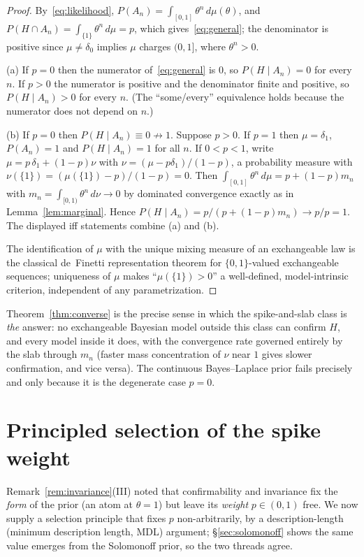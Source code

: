 \documentclass{amsart}
\theoremstyle{definition}
\begin{document}
\begin{proof}
By~\eqref{eq:likelihood}, $P(A_n)=\int_{[0,1]}\theta^n\,d\mu(\theta)$, and
$P(H\cap A_n)=\int_{\{1\}}\theta^n\,d\mu=p$, which gives~\eqref{eq:general}; the
denominator is positive since $\mu\ne\delta_0$ implies $\mu$ charges $(0,1]$,
where $\theta^n>0$.

(a) If $p=0$ then the numerator of~\eqref{eq:general} is $0$, so
$P(H\mid A_n)=0$ for every $n$. If $p>0$ the numerator is positive and the
denominator finite and positive, so $P(H\mid A_n)>0$ for every $n$. (The
``some/every'' equivalence holds because the numerator does not depend on $n$.)

(b) If $p=0$ then $P(H\mid A_n)\equiv0\not\to1$. Suppose $p>0$. If $p=1$ then
$\mu=\delta_1$, $P(A_n)=1$ and $P(H\mid A_n)=1$ for all $n$. If $0<p<1$, write
$\mu=p\,\delta_1+(1-p)\nu$ with $\nu=(\mu-p\delta_1)/(1-p)$, a probability
measure with $\nu(\{1\})=(\mu(\{1\})-p)/(1-p)=0$. Then
$\int_{[0,1]}\theta^n\,d\mu=p+(1-p)m_n$ with $m_n=\int_{[0,1)}\theta^n\,d\nu\to0$
by dominated convergence exactly as in Lemma~\ref{lem:marginal}. Hence
$P(H\mid A_n)=p/(p+(1-p)m_n)\to p/p=1$. The displayed iff statements combine (a)
and (b).

The identification of $\mu$ with the unique mixing measure of an exchangeable law
is the classical de~Finetti representation theorem for $\{0,1\}$-valued
exchangeable sequences; uniqueness of $\mu$ makes ``$\mu(\{1\})>0$'' a
well-defined, model-intrinsic criterion, independent of any parametrization.
\end{proof}

Theorem~\ref{thm:converse} is the precise sense in which the spike-and-slab
class is \emph{the} answer: no exchangeable Bayesian model outside this class can
confirm $H$, and every model inside it does, with the convergence rate governed
entirely by the slab through $m_n$ (faster mass concentration of $\nu$ near $1$
gives slower confirmation, and vice versa). The continuous Bayes--Laplace prior
fails precisely and only because it is the degenerate case $p=0$.

\section{Principled selection of the spike weight}\label{sec:mdl}

Remark~\ref{rem:invariance}(III) noted that confirmability and invariance fix the
\emph{form} of the prior (an atom at $\theta=1$) but leave its \emph{weight}
$p\in(0,1)$ free. We now supply a selection principle that fixes $p$
non\nobreakdash-arbitrarily, by a description-length (minimum description length,
MDL) argument; \S\ref{sec:solomonoff} shows the same value emerges from the
Solomonoff prior, so the two threads agree.
\end{document}
